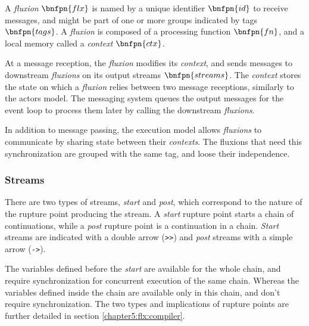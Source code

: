 A \textit{fluxion} $\bnfpn{flx}$ is named by a unique identifier $\bnfpn{id}$ to receive messages, and might be part of one or more groups indicated by tags $\bnfpn{tags}$.
A \textit{fluxion} is composed of a processing function $\bnfpn{fn}$, and a local memory called a \textit{context} $\bnfpn{ctx}$.

At a message reception, the \textit{fluxion} modifies its \textit{context}, and sends messages to downstream \textit{fluxions} on its output streams $\bnfpn{streams}$.
The \textit{context} stores the state on which a \textit{fluxion} relies between two message receptions, similarly to the actors model.
The messaging system queues the output messages for the event loop to process them later by calling the downstream \textit{fluxions}.


In addition to message passing, the execution model allows \textit{fluxions} to communicate by sharing state between their \textit{contexts}.
The fluxions that need this synchronization are grouped with the same tag, and loose their independence.

\subsubsection{Streams}

There are two types of streams, \textit{start} and \textit{post}, which correspond to the nature of the rupture point producing the stream.
A \textit{start} rupture point starts a chain of continuations, while a \textit{post} rupture point is a continuation in a chain.
\textit{Start} streams are indicated with a double arrow (\texttt{>}\texttt{>}) and \textit{post} streams with a simple arrow (\texttt{->}).

The variables defined before the \textit{start} are available for the whole chain, and require synchronization for concurrent execution of the same chain.
Whereas the variables defined inside the chain are available only in this chain, and don't require synchronization.
The two types and implications of rupture points are further detailed in section \ref{chapter5:flx:compiler}.
